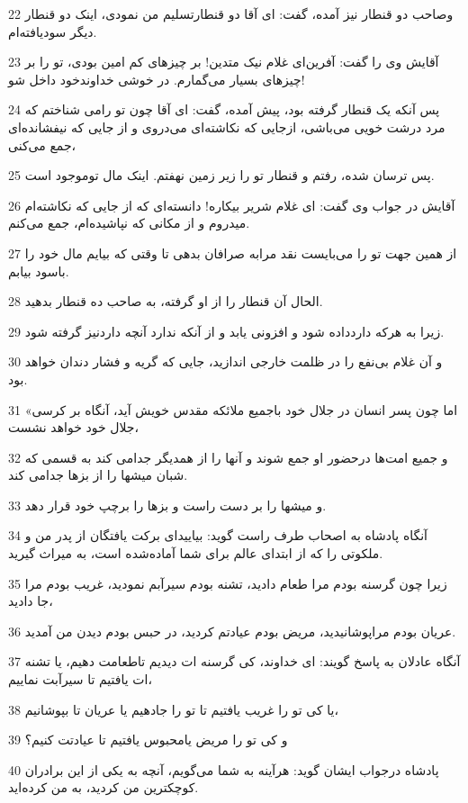 \par 22 وصاحب دو قنطار نیز آمده، گفت: ای آقا دو قنطارتسلیم من نمودی، اینک دو قنطار دیگر سودیافته‌ام.
\par 23 آقایش وی را گفت: آفرین‌ای غلام نیک متدین! بر چیزهای کم امین بودی، تو را بر چیزهای بسیار می‌گمارم. در خوشی خداوندخود داخل شو!
\par 24 پس آنکه یک قنطار گرفته بود، پیش آمده، گفت: ای آقا چون تو رامی شناختم که مرد درشت خویی می‌باشی، ازجایی که نکاشته‌ای می‌دروی و از جایی که نیفشانده‌ای جمع می‌کنی،
\par 25 پس ترسان شده، رفتم و قنطار تو را زیر زمین نهفتم. اینک مال توموجود است.
\par 26 آقایش در جواب وی گفت: ای غلام شریر بیکاره! دانسته‌ای که از جایی که نکاشته‌ام میدروم و از مکانی که نپاشیده‌ام، جمع می‌کنم.
\par 27 از همین جهت تو را می‌بایست نقد مرابه صرافان بدهی تا وقتی که بیایم مال خود را باسود بیابم.
\par 28 الحال آن قنطار را از او گرفته، به صاحب ده قنطار بدهید.
\par 29 زیرا به هر‌که داردداده شود و افزونی یابد و از آنکه ندارد آنچه داردنیز گرفته شود.
\par 30 و آن غلام بی‌نفع را در ظلمت خارجی اندازید، جایی که گریه و فشار دندان خواهد بود.
\par 31 «اما چون پسر انسان در جلال خود باجمیع ملائکه مقدس خویش آید، آنگاه بر کرسی جلال خود خواهد نشست،
\par 32 و جمیع امت‌ها درحضور او جمع شوند و آنها را از همدیگر جدامی کند به قسمی که شبان میشها را از بزها جدامی کند.
\par 33 و میشها را بر دست راست و بزها را برچپ خود قرار دهد.
\par 34 آنگاه پادشاه به اصحاب طرف راست گوید: بیایید‌ای برکت یافتگان از پدر من و ملکوتی را که از ابتدای عالم برای شما آماده‌شده است، به میراث گیرید.
\par 35 زیرا چون گرسنه بودم مرا طعام دادید، تشنه بودم سیرآبم نمودید، غریب بودم مرا جا دادید،
\par 36 عریان بودم مراپوشانیدید، مریض بودم عیادتم کردید، در حبس بودم دیدن من آمدید.
\par 37 آنگاه عادلان به پاسخ گویند: ای خداوند، کی گرسنه ات دیدیم تاطعامت دهیم، یا تشنه ات یافتیم تا سیرآبت نماییم،
\par 38 یا کی تو را غریب یافتیم تا تو را جادهیم یا عریان تا بپوشانیم،
\par 39 و کی تو را مریض یامحبوس یافتیم تا عیادتت کنیم؟
\par 40 پادشاه درجواب ایشان گوید: هرآینه به شما می‌گویم، آنچه به یکی از این برادران کوچکترین من کردید، به من کرده‌اید.

